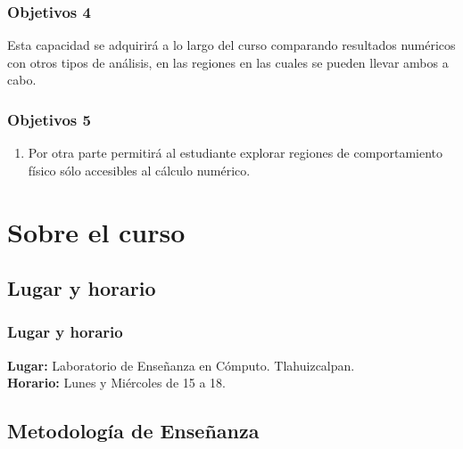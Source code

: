 \documentclass[12pt]{beamer}
\begin{document}
\begin{frame}
\frametitle{Objetivos 4}
Esta capacidad se adquirirá a lo largo del curso comparando resultados numéricos con otros tipos de análisis, en las regiones en las cuales se pueden llevar ambos a cabo.
\end{frame}
\begin{frame}
\frametitle{Objetivos 5}
\begin{enumerate}[<+->]
\conti
\item  Por otra parte permitirá al estudiante explorar regiones de comportamiento físico sólo accesibles al cálculo numérico.
\end{enumerate}
\end{frame}

\section{Sobre el curso}
\subsection{Lugar y horario}

\begin{frame}
\frametitle{Lugar y horario} 
\textbf{Lugar: } Laboratorio de Enseñanza en Cómputo. Tlahuizcalpan.
\\
\bigskip
\textbf{Horario: } Lunes y Miércoles de 15 a 18.
\end{frame}

\subsection{Metodología de Enseñanza}
\end{document}
